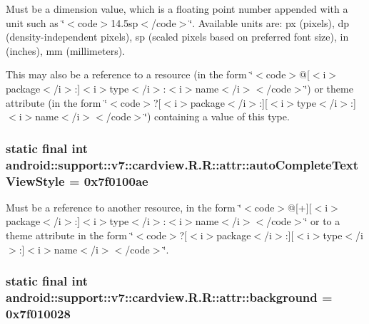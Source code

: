 Must be a dimension value, which is a floating point number appended with a unit such as \char`\"{}$<$code$>$14.5sp$<$/code$>$\char`\"{}. Available units are: px (pixels), dp (density-independent pixels), sp (scaled pixels based on preferred font size), in (inches), mm (millimeters). 

This may also be a reference to a resource (in the form \char`\"{}$<$code$>$@\mbox{[}$<$i$>$package$<$/i$>$:\mbox{]}$<$i$>$type$<$/i$>$:$<$i$>$name$<$/i$>$$<$/code$>$\char`\"{}) or theme attribute (in the form \char`\"{}$<$code$>$?\mbox{[}$<$i$>$package$<$/i$>$:\mbox{]}\mbox{[}$<$i$>$type$<$/i$>$:\mbox{]}$<$i$>$name$<$/i$>$$<$/code$>$\char`\"{}) containing a value of this type. \hypertarget{classandroid_1_1support_1_1v7_1_1cardview_1_1_r_1_1attr_0c6c17a2c9ef83ccdca038cf17aab9c3}{
\subsubsection[{autoCompleteTextViewStyle}]{\setlength{\rightskip}{0pt plus 5cm}static final int android::support::v7::cardview.R.R::attr::autoCompleteTextViewStyle = 0x7f0100ae}}
\label{classandroid_1_1support_1_1v7_1_1cardview_1_1_r_1_1attr_0c6c17a2c9ef83ccdca038cf17aab9c3}


Must be a reference to another resource, in the form \char`\"{}$<$code$>$@\mbox{[}+\mbox{]}\mbox{[}$<$i$>$package$<$/i$>$:\mbox{]}$<$i$>$type$<$/i$>$:$<$i$>$name$<$/i$>$$<$/code$>$\char`\"{} or to a theme attribute in the form \char`\"{}$<$code$>$?\mbox{[}$<$i$>$package$<$/i$>$:\mbox{]}\mbox{[}$<$i$>$type$<$/i$>$:\mbox{]}$<$i$>$name$<$/i$>$$<$/code$>$\char`\"{}. \hypertarget{classandroid_1_1support_1_1v7_1_1cardview_1_1_r_1_1attr_4c07ac8fa1ddb5e186c59f0742f46165}{
\subsubsection[{background}]{\setlength{\rightskip}{0pt plus 5cm}static final int android::support::v7::cardview.R.R::attr::background = 0x7f010028}}
\label{classandroid_1_1support_1_1v7_1_1cardview_1_1_r_1_1attr_4c07ac8fa1ddb5e186c59f0742f46165}


